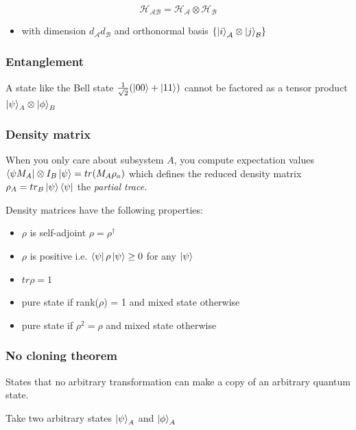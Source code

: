 \documentclass[11pt]{article}
\begin{document}
\begin{equation*}
	\mathcal{H}_{\mathcal{A}\mathcal{B}} = \mathcal{H}_{\mathcal{A}} \otimes \mathcal{H}_{\mathcal{B}}
\end{equation*}

\begin{itemize}
	\item with dimension $d_{\mathcal{A}}d_{\mathcal{B}}$ and orthonormal basis $\{\ket{i}_{\mathcal{A}} \otimes \ket{j}_{\mathcal{B}}\}$
\end{itemize}

\subsubsection{Entanglement}

A state like the Bell state $\frac{1}{\sqrt2}(\ket{00} + \ket{11})$ cannot be factored as a tensor product $\ket{\psi}_A \otimes \ket{\phi}_B$

\subsubsection{Density matrix} When you only care about subsystem $A$, you compute expectation values $\bra{\psi M_A} \otimes I_B \ket{\psi} = tr(M_A\rho_a)$ which defines the reduced density matrix $\rho_A = tr_B \ket{\psi}\bra{\psi}$ the \textit{partial trace}.

Density matrices have the following properties:

\begin{itemize}
	\item $\rho$ is self-adjoint $\rho = \rho^{\dagger}$
	\item $\rho$ is positive i.e. $\bra{\psi}\rho\ket{\psi} \ge 0$ for any $\ket{\psi}$
	\item $tr \rho = 1$
	\item pure state if rank($\rho$) = 1 and mixed state otherwise
	\item pure state if $\rho^2 = \rho$ and mixed state otherwise
\end{itemize}

\subsubsection{No cloning theorem}

States that no arbitrary transformation can make a copy of an arbitrary quantum state.

Take two arbitrary states $\ket{\psi}_A$ and $\ket{\phi}_A$
\end{document}
